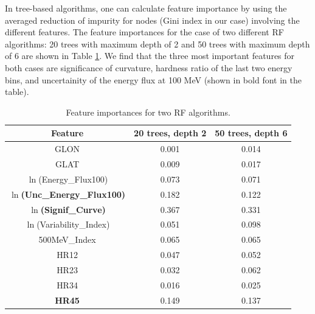 In tree-based algorithms, one can calculate feature importance by using the averaged reduction of impurity for nodes (Gini index in our case) involving the different features. 
The feature importances for the case of two different RF algorithms: 20 trees with maximum depth of 2 and 50 trees with maximum depth of 6 are shown in Table \ref{tab:feat_imp}.
We find that the three most important features for both cases are significance of curvature, hardness ratio of the last two energy bins, and uncertainity of the energy flux at 100 MeV (shown in bold font in the table).


\begin{table}[!h]
    \tiny
    \centering
    \renewcommand{\tabcolsep}{1mm}
\renewcommand{\arraystretch}{1}

    \begin{tabular}{|c|c|c|}
    \hline
    Feature &  20 trees, depth 2& 50 trees, depth 6\\
    \hline
    GLON & 0.001 & 0.014        \\
    \hline
    GLAT & 0.009     & 0.017 \\
    \hline %
   $\ln$(Energy\_Flux100) & 0.073   &   0.071\\
    \hline %
    {\bf $\ln$(Unc\_Energy\_Flux100)} & 0.182 &0.122  \\
    \hline
   {\bf$\ln$(Signif\_Curve)}&  0.367  &  0.331  \\
    \hline %
    $\ln$(Variability\_Index)& 0.051 &0.098 \\
    \hline
     500MeV\_Index& 0.065 &0.065 \\
    \hline
    HR12& 0.047 &0.052 \\
    \hline
   HR23 & 0.032 &0.062 \\
    \hline
    HR34&0.016&0.025\\
    \hline
{\bf HR45}&0.149&0.137\\
\hline
    \end{tabular}
    \vspace{0.4cm}
    \caption{Feature importances for two RF algorithms.}
    \label{tab:feat_imp}
\end{table}

